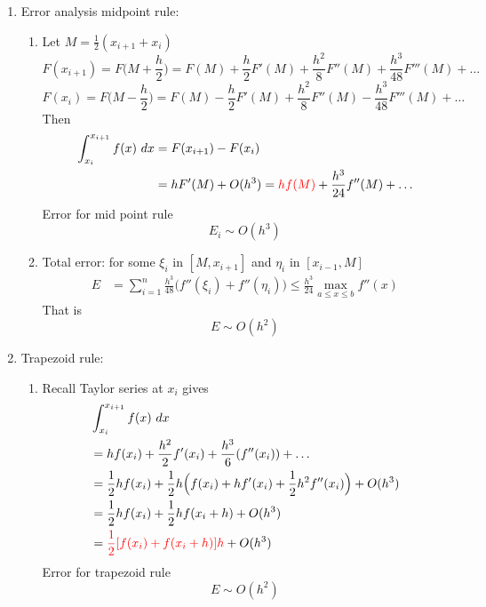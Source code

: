 \documentclass{article}
\theoremstyle{remark}
\begin{document}
\begin{enumerate}
\begin{enumerate}
\item Error analysis midpoint rule:
\begin{enumerate}
\item Let $M = \frac{1}{2}(x_{i+1}+x_i)$
$$
F(x_{i+1}) = F\Big(M+\frac{h}{2}\Big) = F(M)+\frac{h}{2}F'(M)+\frac{h^2}{8}F''(M) + \frac{h^3}{48}F'''(M)+\dots
$$
$$
F(x_{i}) = F\Big(M-\frac{h}{2}\Big) = F(M)-\frac{h}{2}F'(M)+\frac{h^2}{8}F''(M) - \frac{h^3}{48}F'''(M)+\dots
$$
Then
\begin{equation*}
\begin{split}
\int_{x_i}^{x_{i+1}}f(x)~dx & = F(x_{i+1})-F(x_{i})\\&
 = hF'(M) +O(h^3) = {\color{red}hf(M)} + \frac{h^3}{24}f''(M)+\dots
 \end{split}
 \end{equation*}
 Error for mid point rule
 $$
 E_i \sim O(h^3)
 $$

\item Total error: for some $\xi_i$ in $[M,x_{i+1}]$ and $\eta_i$ in $[x_{i-1},M]$
\begin{equation*}
\begin{split}
E &= \sum_{i=1}^n\frac{h^3}{48}\Big(f''(\xi_i)+f''(\eta_i)\Big)\leq \frac{h^3}{24}\max_{a\leq x\leq b}f''(x)
\end{split}
\end{equation*}
That is
$$
E \sim O(h^2)
$$
\end{enumerate}


\item Trapezoid rule: 
\begin{enumerate}
\item Recall Taylor series at $x_i$ gives
\begin{equation*}
\begin{split}
& \int_{x_i}^{x_{i+1}}f(x)~dx \\
& = hf(x_i) + \frac{h^2}{2}f'(x_i) + \frac{h^3}{6}(f''(x_i)) + \dots\\
 & = \frac{1}{2}hf(x_i) + \frac{1}{2}h\Big( f(x_i)+ hf'(x_i)+\frac{1}{2}h^2f''(x_i)\Big) + O(h^3)\\
 & = \frac{1}{2}hf(x_i) + \frac{1}{2}hf(x_i+h) + O(h^3)\\
& =  {\color{red}\frac{1}{2}[f(x_i) + f(x_i+h)]h}  + O(h^3)
\end{split}
\end{equation*}
Error for trapezoid rule
$$
E \sim O(h^2)
$$


\end{enumerate}
\end{enumerate}
\end{enumerate}
\end{document}
